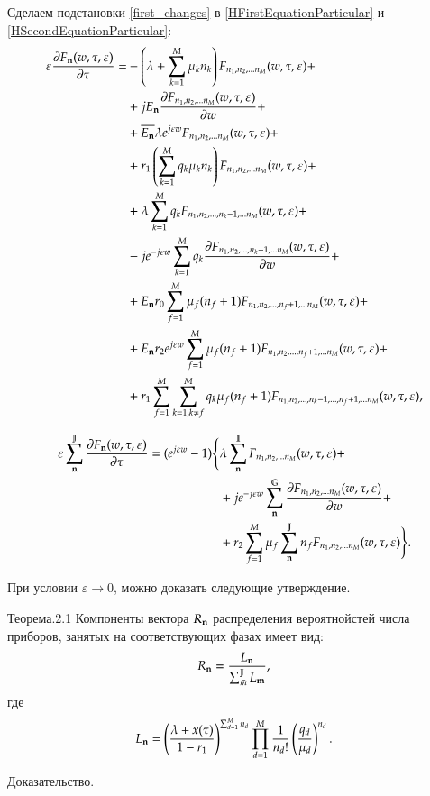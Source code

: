 Сделаем подстановки \eqref{first_changes} в 
\eqref{HFirstEquationParticular} и \eqref{HSecondEquationParticular}:
\begin{equation}\begin{aligned}
\label{FFirstEquationParticular}
\varepsilon \pdv{{F}_{\bold{n}}(w,\tau,\varepsilon)}{\tau}=
    &-\left( {\lambda+\sum_{{k}=1}^{M}\mu_{k}{n}_{k}} \right){F}_{{n}_1, {n}_2, ... {n}_{M}}(w,\tau,\varepsilon)+\\
    &+j E_{\bold{n}} \pdv{ {F}_{{n}_1, {n}_2, ... {n}_{M}} (w,\tau,\varepsilon)}{w}(i,\tau) + \\
    &+\overline{E_{\bold{n}}} \lambda e^{j\varepsilon w} {F}_{{n}_1, {n}_2, ... {n}_{M}}(w,\tau,\varepsilon)+\\
    &+r_1 \left( {\sum_{{k}=1}^{M} q_{k}\mu_{k}{n}_{k}} \right) {F}_{{n}_1, {n}_2, ... {n}_{M}}(w,\tau,\varepsilon) + \\
    &+\lambda\sum_{k=1}^{M}q_k {F}_{{n}_1, {n}_2, ... , {n}_{k} - 1, ... {n}_{M}}(w,\tau,\varepsilon) + \\
    &-j  e^{-j\varepsilon w} \sum_{k=1}^{M}q_k \pdv{ {F}_{{n}_1, {n}_2, ... , {n}_{k} - 1, ... {n}_{M}} (w,\tau,\varepsilon)}{w} + \\
    &+E_{\bold{n}} r_0 \sum_{f=1}^{M} \mu_f (n_f + 1) {F}_{{n}_1, {n}_2, ... , {n}_{f} + 1, ... {n}_{M}}(w,\tau,\varepsilon) + \\
    &+E_{\bold{n}} r_2 e^{j\varepsilon w} \sum_{f=1}^{M} \mu_f (n_f + 1) {F}_{{n}_1, {n}_2, ... , {n}_{f} + 1, ... {n}_{M}}(w,\tau,\varepsilon) + \\
    &+r_1 \sum_{{f}=1}^{M} \sum_{{k}=1, {k} \neq {f}}^{M}
        q_k \mu_f (n_f+1) {F}_{{n}_1, {n}_2, ... , {n}_{k} - 1, ... , {n}_{f} + 1, ... {n}_{M}}(w,\tau,\varepsilon),
\end{aligned}\end{equation}

\begin{equation}\begin{aligned}\label{FSecondEquationParticular}
\varepsilon \sum_{\bold{n}}^{\mathbb{J}} \pdv{{F}_{\bold{n}}(w,\tau,\varepsilon)}{\tau}=(e^{j \varepsilon w} - 1)
\Bigg\{
    &\lambda \sum_{\bold{n}}^{\mathbb{I}} {F}_{{n}_1, {n}_2, ... {n}_{M}}(w,\tau,\varepsilon)+\\
    &+j e^{-j \varepsilon w} \sum_{\bold{n}}^{\mathbb{G}}\pdv{ {F}_{{n}_1, {n}_2, ... {n}_{M}} (w,\tau,\varepsilon)}{w} + \\
    &+r_2\sum_{f=1}^{M} \mu_f \sum_{\bold{n}}^{\mathbb{J}} n_f {F}_{{n}_1, {n}_2, ... {n}_{M}}(w,\tau,\varepsilon)
\Bigg\}
.
\end{aligned}\end{equation}

При условии \(\varepsilon \rightarrow 0\), можно
доказать следующие утверждение.

Теорема.2.1 Компоненты вектора \(R_{\bold{n}}\) распределения вероятнойстей
числа приборов, занятых на соответствующих фазах имеет вид:
\[R_{\bold{n}} = \frac{L_{\bold{n}}}{\sum_{\bar{m}}^{\mathbb{J}}L_{\bold{m}}},\]
где
\[L_{\bold{n}} = \left( {\frac{\lambda + x(\tau)}{1-r_1}} \right)^{ \sum_{d=1}^{M}{n}_{d} } \prod_{{d}=1}^{M} \frac{1}{{n}_{d}!} \left( {\frac{q_{d}}{\mu_{d}}} \right)^{{n}_{d}}.\]

Доказательство.
